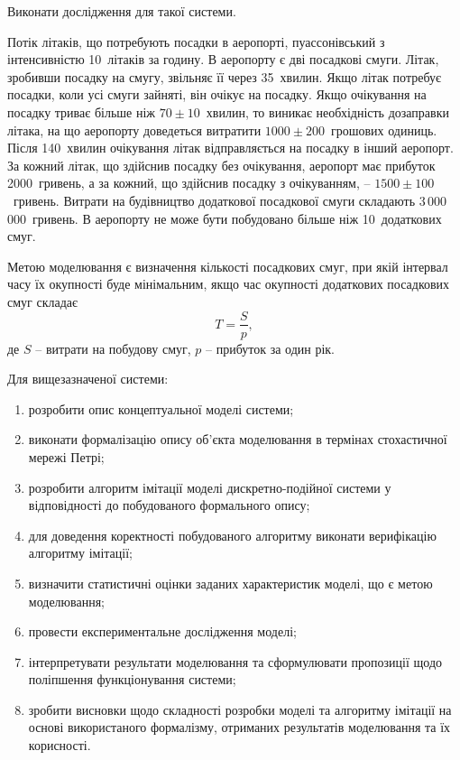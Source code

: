 
Виконати дослідження для такої системи.

Потік літаків, що потребують посадки в аеропорті, пуассонівський з інтенсивністю 10~літаків за годину. В аеропорту є дві посадкові смуги. Літак, зробивши посадку на смугу, звільняє її через 35~хвилин. Якщо літак потребує посадки, коли усі смуги зайняті, він очікує на посадку. Якщо очікування на посадку триває більше ніж $70 \pm 10$~хвилин, то виникає необхідність дозаправки літака, на що аеропорту доведеться витратити $1000 \pm 200$~грошових одиниць. Після 140~хвилин очікування літак відправляється на посадку в інший аеропорт. За кожний літак, що здійснив посадку без очікування, аеропорт має прибуток 2000~гривень, а за кожний, що здійснив посадку з очікуванням, -- $1500 \pm 100$~гривень. Витрати на будівництво додаткової посадкової смуги складають 3\,000\,000~гривень. В аеропорту не може бути побудовано більше ніж 10~додаткових смуг.

Метою моделювання є визначення кількості посадкових смуг, при якій інтервал часу їх окупності буде мінімальним, якщо час окупності додаткових посадкових смуг складає
\[
T = \frac{S}{p},
\]
де $S$ -- витрати на побудову смуг, $p$ -- прибуток за один рік.

Для вищезазначеної системи:
\begin{enumerate}[label=\arabic*)]
\item розробити опис концептуальної моделі системи;
\item виконати формалізацію опису об'єкта моделювання в термінах стохастичної мережі Петрі;
\item розробити алгоритм імітації моделі дискретно-подійної системи у відповідності до побудованого формального опису;
\item для доведення коректності побудованого алгоритму виконати верифікацію алгоритму імітації;
\item визначити статистичні оцінки заданих характеристик моделі, що є метою моделювання;
\item провести експериментальне дослідження моделі;
\item інтерпретувати результати моделювання та сформулювати пропозиції щодо поліпшення функціонування системи;
\item зробити висновки щодо складності розробки моделі та алгоритму імітації на основі використаного формалізму, отриманих результатів моделювання та їх корисності.
\end{enumerate}
